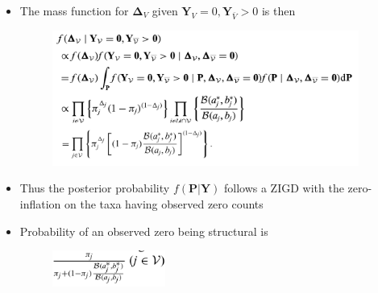 \documentclass{beamer}
\begin{document}
\begin{frame}
\frametitle{}
\begin{itemize}
  \item The mass function for $\boldsymbol\Delta_V$ given $\bm{Y}_V = 0, \bm{Y}_{\bar{V}} > 0$ is then

\begin{figure}[!htb]
	\centering
	\includegraphics[width=0.95\textwidth]{img/2022.02.10_Zero_Inflated_generalized_Dirichlet_Multinomial-570dc718.png}
\end{figure}

\item Thus the posterior probability $f(\bm{P}|\bm{Y})$ follows a ZIGD with the zero-inflation on the taxa having observed zero counts
\item Probability of an observed zero being structural is
\begin{figure}[!htb]
	\centering
	\includegraphics[width=0.35\textwidth]{img/2022.02.10_Zero_Inflated_generalized_Dirichlet_Multinomial-b0e76132.png}
\end{figure}
\end{itemize}
\end{frame}
\end{document}
